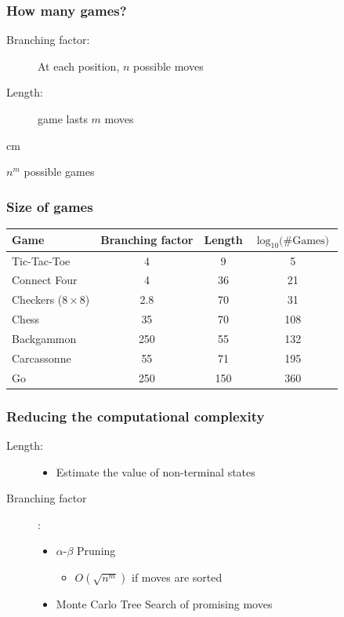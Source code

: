 \documentclass{beamer}
\begin{document}
\begin{frame}
  \frametitle{How many games?}
  \begin{description}
  \item[Branching factor:] At each position, $n$ possible moves
  \item[Length:] game lasts $m$ moves
  \end{description}
   cm
  \begin{tcolorbox}
    \begin{center}
      $n^m$ possible games
    \end{center}
  \end{tcolorbox}
\end{frame}


\begin{frame}
  \frametitle{Size of games}
  \begin{tabular}{l|ccc}
    Game & Branching factor & Length & $\log_{10}\mbox{(\# Games)}$\\ \hline
    Tic-Tac-Toe & 4 & 9 & 5 \\
    Connect Four & 4 & 36 & 21 \\
    Checkers ($8\times 8$) & 2.8 & 70 & 31 \\
    Chess & 35 & 70 & 108 \\
    Backgammon & 250 & 55 & 132 \\
    Carcassonne & 55 & 71 & 195 \\
    Go & 250 & 150 & 360
  \end{tabular}
\end{frame}


\begin{frame}
  \frametitle{Reducing the computational complexity}
  \begin{description}
  \item[Length:]\hfill
    \begin{itemize}
    \item Estimate the value of non-terminal states
    \end{itemize}
  \item[Branching factor]:\hfill
    \begin{itemize}
    \item $\alpha$-$\beta$ Pruning
      \begin{itemize}
      \item $O\left(\sqrt{n^m}\right)$ if moves are sorted
      \end{itemize}
    \item Monte Carlo Tree Search of promising moves
    \end{itemize}
  \end{description}
\end{frame}
\end{document}
